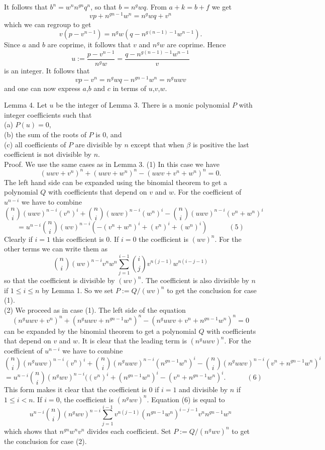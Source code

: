 \documentclass[12pt]{article}
\begin{document}
It follows that
$b^n = w^nn^{gn}q^n$, so that $b= n^gwq$. From $a+k = b+ f $ we get
$$
vp + n^{gn-1}w^n = n^gwq + v^n
$$
which we can regroup to get
$$
v(p-v^{n-1}) = n^gw(q-n^{g(n-1)-1}w^{n-1}).
$$
Since $a$ and $b$ are coprime, it follows that $v$ and $n^gw$ are coprime.
Hence
$$
u:=\frac{p-v^{n-1}}{n^gw} = \frac{q-n^{g(n-1)-1}w^{n-1}}{v}
$$ 
is an integer. 
It follows that
$$
vp - v^n = n^gwq-n^{gn-1}w^n = n^guwv
$$
and one can now express $a$,$b$ and $c$ in terms of $u$,$v$,$w$.


Lemma 4. Let $u$ be the integer of Lemma 3. There is a monic polynomial $P$ 
with integer coefficients such that  \\
(a) $P(u)=0$,  \\
(b) the sum of the roots of $P$ is 0, and \\
(c) all coefficients of $P$ are divisible by $n$ except that when 
$\beta$ is positive  the last coefficient is not divisible by $n$. \\
Proof. We use the same cases as in Lemma 3. (1) In this case we have
$$
(uwv+v^n)^n + (uwv+w^n )^n - (uwv+v^n + w^n)^n = 0.
$$
The left hand side can be  expanded using the binomial theorem to get a 
polynomial $Q$ 
with coefficients that
depend on $v$ and $w$.  For the coefficient of $u^{n-i}$ we have to combine
$$
\binom{n}{i}(uwv)^{n-i}(v^n)^i + \binom{n}{i}(uwv)^{n-i}(w^n)^i - \binom{n}{i}(uwv)^{n-i}(v^n+w^n)^i
$$ 
$$
= u^{n-i}\binom{n}{i}(wv)^{n-i}(-(v^n+w^n)^i + (v^n)^i+(w^n)^i)  \quad \quad \quad (5)
$$
Clearly if $i=1$ this coefficient is 0. 
If $i=0$ the coefficient is $(wv)^n$. 
For the other terms we can write
them as
$$
\binom{n}{i}(wv)^{n-i}v^nw^n\sum_{j=1}^{i-1}\binom{i}{j}v^{n(j-1)}w^{n(i-j-1)}
$$ 
so that the coefficient is divisible by $(wv)^n$.
The coefficient is also divisible by $n$ if $1 \le i \le n$ by Lemma 1. 
So we set $P := Q/(wv)^n$ to get the conclusion for case (1). \\
(2) We proceed as in case (1). The left side of the equation 
$$
(n^guwv+v^n)^n + (n^guwv+n^{gn-1}w^n)^n - (n^guwv+v^n+n^{gn-1}w^n)^n =0
$$ 
can be expanded by the binomial theorem to get a polynomial
$Q$ with coefficients that depend on $v$ and $w$. 
It is clear that the leading term is
$(n^guwv)^n$. For the coefficient of $u^{n-i}$ we have to combine
$$
\binom{n}{i}(n^guwv)^{n-i}(v^n)^i+\binom{n}{i}(n^guwv)^{n-i}(n^{gn-1}w^n)^i-\binom{n}{i}(n^guwv)^{n-i}(v^n+n^{gn-1}w^n)^i
$$
$$
=u^{n-i}\binom{n}{i}(n^gwv)^{n-i}((v^n)^i+(n^{gn-1}w^n)^i-(v^n+n^{gn-1}w^n)^i . \quad \quad \quad (6)
$$
This form makes it clear that the coefficient is 0 if $i=1$ and divisible by $n$ if
$1 \le i < n$. 
If $i=0$, the coefficient is $(n^gwv)^n$. Equation (6) is equal to 
$$
u^{n-i}\binom{n}{i}(n^gwv)^{n-i} \sum_{j=1}^{i-1}v^{n(j-1)}(n^{gn-1}w^n)^{i-j-1}v^nn^{gn-1}w^n
$$
which shows that $n^{gn}w^nv^n$ divides each coefficient. Set
$P:=Q/(n^gwv)^n$ to get the conclusion for case (2).
\end{document}
